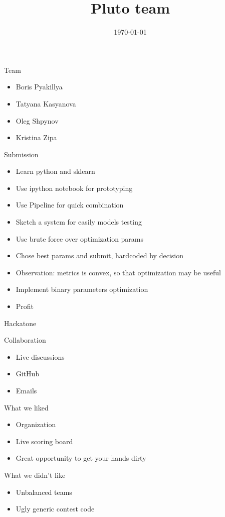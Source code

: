 \documentclass{beamer}
\title{Pluto team}
\institute{\#MSRMLI2015}
\date{\today}
\begin{document}
\begin{frame}
  \titlepage
\end{frame}

\begin{frame}{Team}
\begin{itemize}
\item Boris Pyakillya
\item Tatyana Kasyanova
\item Oleg Shpynov
\item Kristina Zipa
\end{itemize}
\end{frame}

\begin{frame}{Submission}
\begin{itemize}
\item Learn python and sklearn
\item Use ipython notebook for prototyping
\item Use Pipeline for quick combination
\item Sketch a system for easily models testing
\item Use brute force over optimization params
\item Chose best params and submit, hardcoded by decision
\item Observation: metrics is convex, so that optimization may be useful
\item Implement binary parameters optimization
\item Profit
\end{itemize}
\end{frame}

\begin{frame}{Hackatone}
\begin{block}{Collaboration}
\begin{itemize}
	\item Live discussions
	\item GitHub
	\item Emails
\end{itemize}
\end{block}
\begin{block}{What we liked}
\begin{itemize}
	\item Organization
	\item Live scoring board
	\item Great opportunity to get your hands dirty
\end{itemize}
\end{block}
\begin{block}{What we didn't like}
\begin{itemize}
	\item Unbalanced teams
	\item Ugly generic contest code
\end{itemize}
\end{block}
\end{frame}

\begin{frame}
\end{frame}
\end{document}
